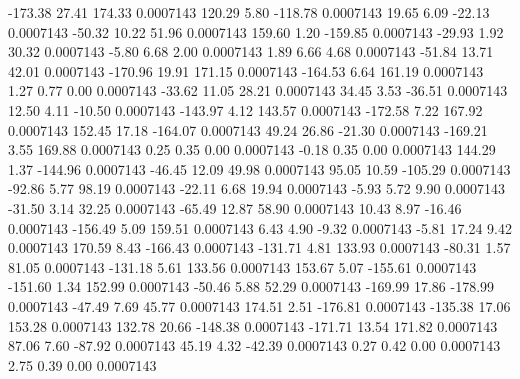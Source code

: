      -173.38       27.41      174.33     0.0007143
      120.29        5.80     -118.78     0.0007143
       19.65        6.09      -22.13     0.0007143
      -50.32       10.22       51.96     0.0007143
      159.60        1.20     -159.85     0.0007143
      -29.93        1.92       30.32     0.0007143
       -5.80        6.68        2.00     0.0007143
        1.89        6.66        4.68     0.0007143
      -51.84       13.71       42.01     0.0007143
     -170.96       19.91      171.15     0.0007143
     -164.53        6.64      161.19     0.0007143
        1.27        0.77        0.00     0.0007143
      -33.62       11.05       28.21     0.0007143
       34.45        3.53      -36.51     0.0007143
       12.50        4.11      -10.50     0.0007143
     -143.97        4.12      143.57     0.0007143
     -172.58        7.22      167.92     0.0007143
      152.45       17.18     -164.07     0.0007143
       49.24       26.86      -21.30     0.0007143
     -169.21        3.55      169.88     0.0007143
        0.25        0.35        0.00     0.0007143
       -0.18        0.35        0.00     0.0007143
      144.29        1.37     -144.96     0.0007143
      -46.45       12.09       49.98     0.0007143
       95.05       10.59     -105.29     0.0007143
      -92.86        5.77       98.19     0.0007143
      -22.11        6.68       19.94     0.0007143
       -5.93        5.72        9.90     0.0007143
      -31.50        3.14       32.25     0.0007143
      -65.49       12.87       58.90     0.0007143
       10.43        8.97      -16.46     0.0007143
     -156.49        5.09      159.51     0.0007143
        6.43        4.90       -9.32     0.0007143
       -5.81       17.24        9.42     0.0007143
      170.59        8.43     -166.43     0.0007143
     -131.71        4.81      133.93     0.0007143
      -80.31        1.57       81.05     0.0007143
     -131.18        5.61      133.56     0.0007143
      153.67        5.07     -155.61     0.0007143
     -151.60        1.34      152.99     0.0007143
      -50.46        5.88       52.29     0.0007143
     -169.99       17.86     -178.99     0.0007143
      -47.49        7.69       45.77     0.0007143
      174.51        2.51     -176.81     0.0007143
     -135.38       17.06      153.28     0.0007143
      132.78       20.66     -148.38     0.0007143
     -171.71       13.54      171.82     0.0007143
       87.06        7.60      -87.92     0.0007143
       45.19        4.32      -42.39     0.0007143
        0.27        0.42        0.00     0.0007143
        2.75        0.39        0.00     0.0007143
